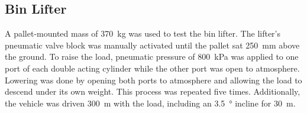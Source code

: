 \documentclass[preprint,authoryear,12pt]{elsarticle}
\begin{document}




  \subsection{Bin Lifter}

    A pallet-mounted mass of \SI{370}{\kilo\gram} was used to test the bin lifter.
    The lifter's pneumatic valve block was manually activated until the pallet sat \SI{250}{\milli\meter} above the ground.
    To raise the load, pneumatic pressure of \SI{800}{\kilo\pascal} was applied to one port of each double acting cylinder while the other port was open to atmosphere.
    Lowering was done by opening both ports to atmosphere and allowing the load to descend under its own weight.
    This process was repeated five times.
    Additionally, the vehicle was driven \SI{300}{\meter} with the load, including an \SI{3.5}{\degree} incline for \SI{30}{\meter}.
\end{document}
